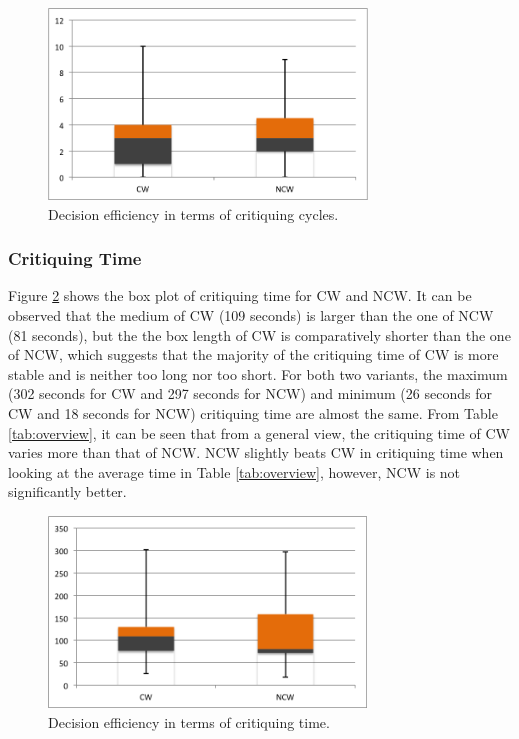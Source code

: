 \begin{figure}[H]
	\centering
	\includegraphics[height=2in]{figures/critiquingCycles.png}
	\caption{Decision efficiency in terms of critiquing cycles.}
	\label{fig:critiquingCycles}
\end{figure}

\subsubsection{Critiquing Time} \label{sec:results_de_ct}

Figure \ref{fig:critiquingTime} shows the box plot of critiquing time for CW and NCW. It can be observed that the medium of CW (109 seconds) is larger than the one of NCW (81 seconds), but the the box length of CW is comparatively shorter than the one of NCW, which suggests that the majority of the critiquing time of CW is more stable and is neither too long nor too short. For both two variants, the maximum (302 seconds for CW and 297 seconds for NCW) and minimum  (26 seconds for CW and 18 seconds for NCW) critiquing time are almost the same. 
From Table \ref{tab:overview}, it can be seen that from a general view, the critiquing time of CW varies more than that of NCW. NCW slightly beats CW in critiquing time when looking at the average time in Table \ref{tab:overview}, however, NCW is not significantly better.

\begin{figure}[H]
	\centering
	\includegraphics[height=2in]{figures/critiquingTime.png}
	\caption{Decision efficiency in terms of critiquing time.}
	\label{fig:critiquingTime}
\end{figure}

